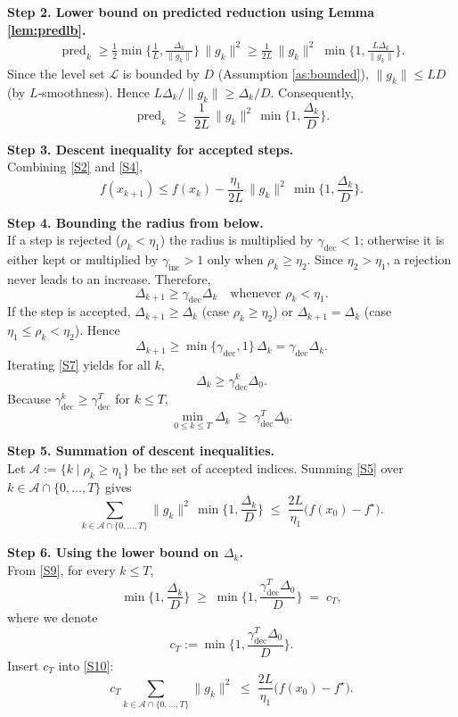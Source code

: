\documentclass{article}
\begin{document}
\noindent\textbf{Step 2.  Lower bound on predicted reduction using Lemma \ref{lem:predlb}.}\\
\begin{align}
\operatorname{pred}_k
\ge \frac12\min\!\Big\{\frac{1}{L},\frac{\Delta_k}{\|g_k\|}\Big\}\,\|g_k\|^{2}
\ge \frac{1}{2L}\,\|g_k\|^{2}\;\min\Big\{1,\frac{L\Delta_k}{\|g_k\|}\Big\}.
\tag{S3}
\end{align}
Since the level set $\mathcal{L}$ is bounded by $D$ (Assumption \ref{as:bounded}),
$\|g_k\|\le L D$ (by $L$‑smoothness).  Hence $L\Delta_k/\|g_k\|\ge
\Delta_k/D$.  Consequently,
\[
\operatorname{pred}_k\;\ge\;\frac{1}{2L}\,\|g_k\|^{2}\,\min\!\Big\{1,\frac{\Delta_k}{D}\Big\}.
\tag{S4}
\]

\noindent\textbf{Step 3.  Descent inequality for accepted steps.}\\
Combining \eqref{S2} and \eqref{S4},
\[
f(x_{k+1})\le f(x_k)-\frac{\eta_1}{2L}\,\|g_k\|^{2}\,
\min\!\Big\{1,\frac{\Delta_k}{D}\Big\}.
\tag{S5}
\]

\noindent\textbf{Step 4.  Bounding the radius from below.}\\
If a step is rejected ($\rho_k<\eta_1$) the radius is multiplied by
$\gamma_{\text{dec}}<1$; otherwise it is either kept or multiplied by
$\gamma_{\text{inc}}>1$ only when $\rho_k\ge\eta_2$.  Since $\eta_2>\eta_1$, a
rejection never leads to an increase.  Therefore,
\[
\Delta_{k+1}\ge \gamma_{\text{dec}}\Delta_k\quad\text{whenever }\rho_k<\eta_1.
\tag{S6}
\]
If the step is accepted, $\Delta_{k+1}\ge\Delta_k$ (case $\rho_k\ge\eta_2$) or
$\Delta_{k+1}=\Delta_k$ (case $\eta_1\le\rho_k<\eta_2$).  Hence
\[
\Delta_{k+1}\ge \min\{\gamma_{\text{dec}},1\}\,\Delta_k
= \gamma_{\text{dec}}\Delta_k .
\tag{S7}
\]
Iterating \eqref{S7} yields for all $k$,
\[
\Delta_k\ge \gamma_{\text{dec}}^{k}\Delta_0 .
\tag{S8}
\]
Because $\gamma_{\text{dec}}^{k}\ge \gamma_{\text{dec}}^{T}$ for $k\le T$,
\[
\min_{0\le k\le T}\Delta_k\;\ge\;
\gamma_{\text{dec}}^{T}\Delta_0.
\tag{S9}
\]

\noindent\textbf{Step 5.  Summation of descent inequalities.}\\
Let $\mathcal{A}:=\{k\mid\rho_k\ge\eta_1\}$ be the set of accepted indices.
Summing \eqref{S5} over $k\in\mathcal{A}\cap\{0,\dots,T\}$ gives
\[
\sum_{k\in\mathcal{A}\cap\{0,\dots,T\}}
\|g_k\|^{2}\,
\min\!\Big\{1,\frac{\Delta_k}{D}\Big\}
\;\le\;
\frac{2L}{\eta_1}\bigl(f(x_0)-f^{\star}\bigr).
\tag{S10}
\]

\noindent\textbf{Step 6.  Using the lower bound on $\Delta_k$.}\\
From \eqref{S9}, for every $k\le T$,
\[
\min\!\Big\{1,\frac{\Delta_k}{D}\Big\}
\;\ge\;
\min\!\Big\{1,\frac{\gamma_{\text{dec}}^{T}\Delta_0}{D}\Big\}
\;=\;
c_T,
\]
where we denote
\[
c_T:=\min\Big\{1,\frac{\gamma_{\text{dec}}^{T}\Delta_0}{D}\Big\}.
\tag{S11}
\]
Insert $c_T$ into \eqref{S10}:
\[
c_T\sum_{k\in\mathcal{A}\cap\{0,\dots,T\}}\|g_k\|^{2}
\;\le\;
\frac{2L}{\eta_1}\bigl(f(x_0)-f^{\star}\bigr).
\tag{S12}
\]
\end{document}
